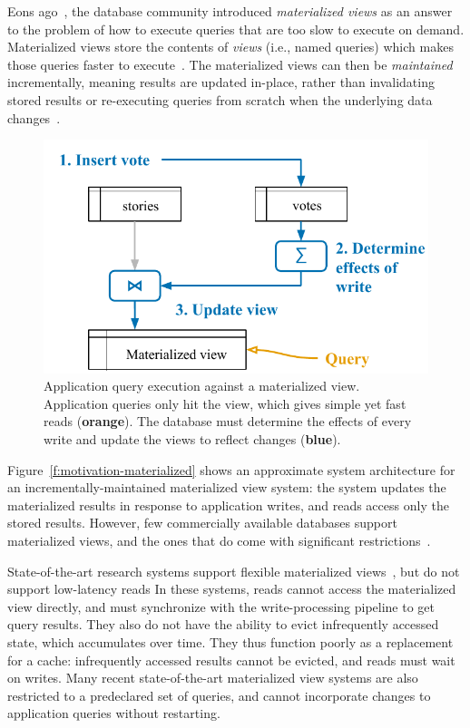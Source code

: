 
Eons ago~\cite{relational-materialized-views,stonebraker-views}, the database
community introduced \textit{materialized views} as an answer to the problem of
how to execute queries that are too slow to execute on demand. Materialized
views store the contents of \textit{views} (i.e., named queries) which makes
those queries faster to execute~\cite{materialized-views}. The materialized
views can then be \textit{maintained} incrementally, meaning results are updated
in-place, rather than invalidating stored results or re-executing queries from
scratch when the underlying data changes~\cite{materialized-survey}.

\begin{figure}
  \centering
  \includegraphics{diagrams/Motivation Materialized Views.pdf}
  \caption{Application query execution against a materialized view. Application
  queries only hit the view, which gives simple yet fast reads
  (\textbf{\color{set2}orange}). The database must determine the effects of
  every write and update the views to reflect changes
  (\textbf{\color{set1}blue}).}
  \label{f:motivation-materialized}
\end{figure}

Figure~\vref{f:motivation-materialized} shows an approximate system architecture
for an incrementally-maintained materialized view system: the system updates the
materialized results in response to application writes, and reads access only
the stored results. However, few commercially available databases support
materialized views, and the ones that do come with significant
restrictions~\cite{mssql-materialized-view-restrictions}.

State-of-the-art research systems support flexible materialized
views~\cite{dbtoaster,materialize}, but do not support low-latency reads In
these systems, reads cannot access the materialized view directly, and must
synchronize with the write-processing pipeline to get query results. They also
do not have the ability to evict infrequently accessed state, which accumulates
over time. They thus function poorly as a replacement for a cache: infrequently
accessed results cannot be evicted, and reads must wait on writes. Many recent
state-of-the-art materialized view systems are also restricted to a predeclared
set of queries, and cannot incorporate changes to application queries without
restarting.

